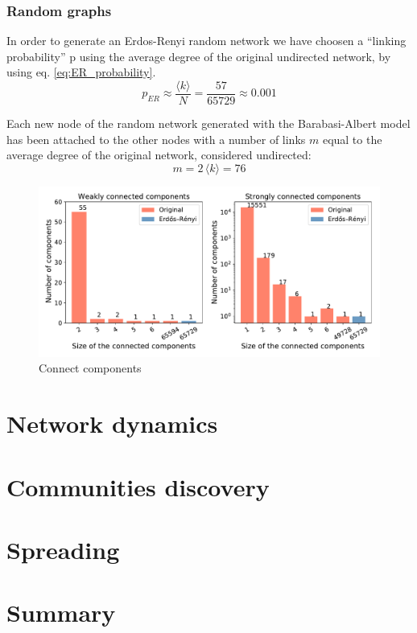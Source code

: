 \documentclass[12pt, twoside]{report}
\begin{document}
    \subsection{Random graphs} 
    In order to generate an Erdos-Renyi random network we have choosen a ``linking probability'' p using the average degree of the original undirected network, by using eq. \ref{eq:ER_probability}.
    \begin{equation}
      p_{ER} \approx \frac{\langle k  \rangle}{N} = \frac{57}{65729} \approx  0.001
      \label{eq:ER_probability}
    \end{equation}

    Each new node of the random network generated with the Barabasi-Albert model has been attached to the other nodes with a number of links $m$ equal to the average degree of the original network, considered undirected:
    \begin{equation}
      m = 2 \, \langle k \rangle = 76
      \label{eq:BA_model}
    \end{equation}

    
    \begin{figure}[htbp]
      \centering
      \includegraphics[width=\textwidth]{../../scripts/visualization/imgs/connectivity.pdf}            
      \caption{Connect components}
      \label{fig:connectivity}
    \end{figure}


    
    
    \chapter{Network dynamics}

    \chapter{Communities discovery}

    \chapter{Spreading}
    

    \chapter{Summary}


\printbibliography[title={References}]
\end{document}

